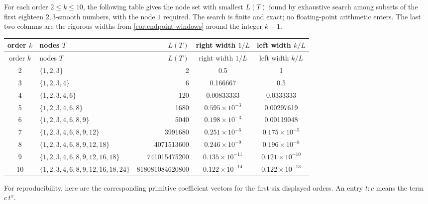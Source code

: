 \documentclass[11pt]{article}
\theoremstyle{definition}
\theoremstyle{remark}
\begin{document}
For each order $2\le k\le10$, the following table gives the node set with smallest $L(T)$ found by exhaustive search among subsets of the first eighteen $2,3$-smooth numbers, with the node $1$ required. The search is finite and exact; no floating-point arithmetic enters. The last two columns are the rigorous widths from \cref{cor:endpoint-windows} around the integer $k-1$.

\begin{center}
\small
\begin{longtable}{@{}c>{\raggedright\arraybackslash}p{45mm}rcc@{}}
\toprule
order $k$ & nodes $T$ & $L(T)$ & right width $1/L$ & left width $k/L$\\
\midrule
\endfirsthead
\toprule
order $k$ & nodes $T$ & $L(T)$ & right width $1/L$ & left width $k/L$\\
\midrule
\endhead
2 & \(\{1,2,3\}\) & 2 & 0.5 & 1 \\
3 & \(\{1,2,3,4\}\) & 6 & 0.166667 & 0.5 \\
4 & \(\{1,2,3,4,6\}\) & 120 & 0.00833333 & 0.0333333 \\
5 & \(\{1,2,3,4,6,8\}\) & 1680 & $0.595\times 10^{-3}$ & 0.00297619 \\
6 & \(\{1,2,3,4,6,8,9\}\) & 5040 & $0.198\times 10^{-3}$ & 0.00119048 \\
7 & \(\{1,2,3,4,6,8,9,12\}\) & 3991680 & $0.251\times 10^{-6}$ & $0.175\times 10^{-5}$ \\
8 & \(\{1,2,3,4,6,8,9,12,18\}\) & 4071513600 & $0.246\times 10^{-9}$ & $0.196\times 10^{-8}$ \\
9 & \(\{1,2,3,4,6,8,9,12,16,18\}\) & 741015475200 & $0.135\times 10^{-11}$ & $0.121\times 10^{-10}$ \\
10 & \(\{1,2,3,4,6,8,9,12,16,18,24\}\) & 818081084620800 & $0.122\times 10^{-14}$ & $0.122\times 10^{-13}$ \\
\bottomrule
\end{longtable}
\end{center}

For reproducibility, here are the corresponding primitive coefficient vectors for the first six displayed orders. An entry $t:c$ means the term $c\,t^x$.
\end{document}
